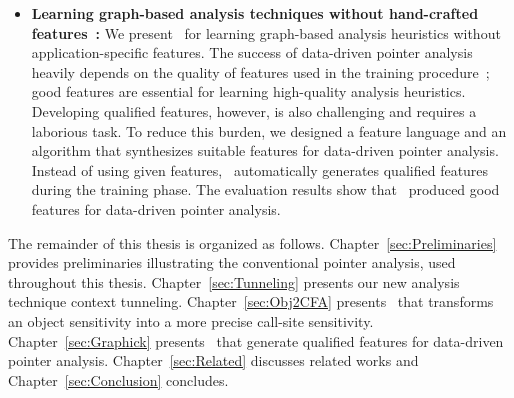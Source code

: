 \begin{itemize}
\item {\bf Learning graph-based analysis techniques without hand-crafted features~\cite{Graphick20}:}
We present \ourtool~for learning graph-based analysis heuristics without application-specific features.
The success of data-driven pointer analysis heavily depends on the quality of features used in the training procedure~\cite{JeJeChOh17,ChOhHeYa17}; good features are essential for learning high-quality analysis heuristics.
Developing qualified features, however, is also challenging and requires a laborious task.
To reduce this burden, we designed a feature language and an algorithm that synthesizes suitable features for data-driven pointer analysis.
Instead of using given features, \ourtool~automatically generates qualified features during the training phase. The evaluation results show that \ourtool~produced good features for data-driven pointer analysis.



\end{itemize}


The remainder of this thesis is organized as follows.
Chapter~{\ref{sec:Preliminaries}} provides preliminaries illustrating the conventional pointer analysis, used throughout this thesis.
Chapter~{\ref{sec:Tunneling}} presents our new analysis technique context tunneling. 
Chapter~{\ref{sec:Obj2CFA}} presents \ourtechnique~that transforms an object sensitivity into a more precise call-site sensitivity.
Chapter~{\ref{sec:Graphick}} presents \ourtool~that generate qualified features for data-driven pointer analysis.
Chapter~{\ref{sec:Related}} discusses related works and
Chapter~{\ref{sec:Conclusion}} concludes.



